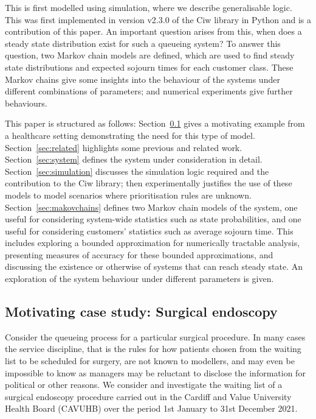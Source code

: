 \documentclass{article}
\begin{document}
This is first modelled using simulation, where we describe generalisable logic.
This was first implemented in version v2.3.0 of the Ciw library in Python
\cite{palmer19} and is a contribution of this paper.
An important question arises from this, when does a steady state distribution
exist for such a queueing system? To answer this question, two Markov chain
models are defined, which are used to find
steady state distributions and expected sojourn times for each customer class.
These Markov chains give some insights into the behaviour of the systems under
different combinations of parameters; and numerical experiments give further
behaviours.

This paper is structured as follows:
Section~\ref{sec:casestudy} gives a motivating example from a healthcare
setting demonstrating the need for this type of model.
Section~\ref{sec:related} highlights some previous and related work.
Section~\ref{sec:system} defines the system under consideration in detail.
Section~\ref{sec:simulation} discusses the simulation logic required and the
contribution to the Ciw library; then experimentally justifies the use of these
models to model scenarios where prioritisation rules are unknown.
Section~\ref{sec:makovchains} defines two Markov chain models of the system, one
useful for considering system-wide statistics such as state probabilities, and
one useful for considering customers' statistics such as average sojourn time.
This includes exploring a bounded approximation for numerically tractable
analysis, presenting measures of accuracy for these bounded approximations, and
discussing the existence or otherwise of systems that can reach steady state.
An exploration of the system behaviour under different parameters is given.

\subsection{Motivating case study: Surgical endoscopy}\label{sec:casestudy}
Consider the queueing process for a particular surgical procedure. In many cases
the service discipline, that is the rules for how patients chosen from the
waiting list to be scheduled for surgery, are not known to modellers, and may
even be impossible to know as managers may be reluctant to disclose the
information for political or other reasons.
We consider and investigate the waiting list of a surgical
endoscopy procedure carried out in the Cardiff and Value University Health Board
(CAVUHB) over the period 1st January to 31st December 2021.
\end{document}
